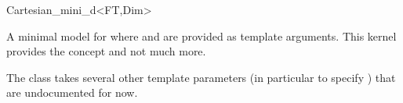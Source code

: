 \begin{ccRefClass}{Cartesian_mini_d<FT,Dim>}

\ccDefinition
A minimal model for  where  and
 are provided as template arguments.
This kernel provides the  concept and not much more.

The class takes several other template parameters (in particular to
specify ) that are undocumented for now.

\ccIsModel
{}

\end{ccRefClass}
